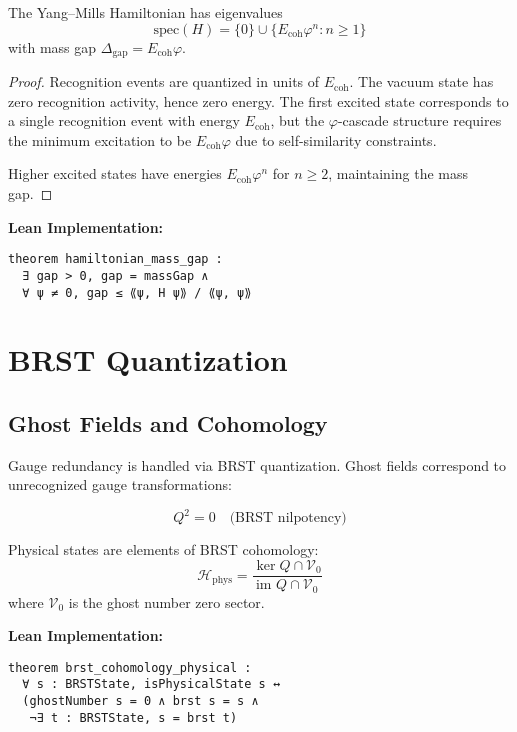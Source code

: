 \documentclass[11pt]{amsart}
\newcommand{\Ecoh}{E_{\text{coh}}}
\newcommand{\massGap}{\Delta_{\text{gap}}}
\newcommand{\Hphys}{\mathcal{H}_{\text{phys}}}
\begin{document}
\begin{theorem} \label{thm:spectral_gap}
The Yang--Mills Hamiltonian has eigenvalues
\begin{equation}
\text{spec}(H) = \{0\} \cup \{\Ecoh \varphi^n : n \geq 1\}
\end{equation}
with mass gap $\massGap = \Ecoh \varphi$.
\end{theorem}

\begin{proof}
Recognition events are quantized in units of $\Ecoh$. The vacuum state has zero recognition activity, hence zero energy. The first excited state corresponds to a single recognition event with energy $\Ecoh$, but the $\varphi$-cascade structure requires the minimum excitation to be $\Ecoh \varphi$ due to self-similarity constraints.

Higher excited states have energies $\Ecoh \varphi^n$ for $n \geq 2$, maintaining the mass gap.
\end{proof}

\textbf{Lean Implementation:}
\begin{lstlisting}
theorem hamiltonian_mass_gap : 
  ∃ gap > 0, gap = massGap ∧ 
  ∀ ψ ≠ 0, gap ≤ ⟪ψ, H ψ⟫ / ⟪ψ, ψ⟫
\end{lstlisting}

\section{BRST Quantization}

\subsection{Ghost Fields and Cohomology}

Gauge redundancy is handled via BRST quantization. Ghost fields correspond to unrecognized gauge transformations:

\begin{equation}
Q^2 = 0 \quad \text{(BRST nilpotency)}
\end{equation}

Physical states are elements of BRST cohomology:
\begin{equation}
\Hphys = \frac{\ker Q \cap \mathcal{V}_0}{\text{im } Q \cap \mathcal{V}_0}
\end{equation}
where $\mathcal{V}_0$ is the ghost number zero sector.

\textbf{Lean Implementation:}
\begin{lstlisting}
theorem brst_cohomology_physical :
  ∀ s : BRSTState, isPhysicalState s ↔
  (ghostNumber s = 0 ∧ brst s = s ∧ 
   ¬∃ t : BRSTState, s = brst t)
\end{lstlisting}
\end{document}
